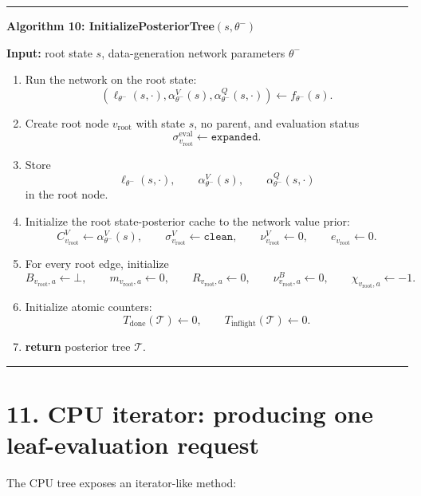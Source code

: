 \documentclass[11pt]{article}
\newcommand{\Tree}{\mathcal{T}}
\newenvironment{algorithmblock}[1]
{
  \par\medskip
  \noindent\hrule\par\smallskip
  \noindent\textbf{#1}
  \par\smallskip
}
{
  \par\smallskip\noindent\hrule\par\medskip
}
\newcommand{\Input}{\textbf{Input: }}
\newcommand{\Return}{\textbf{return }}
\begin{document}
\begin{algorithmblock}{Algorithm 10: InitializePosteriorTree\((s,\theta^-)\)}

\Input root state \(s\), data-generation network parameters \(\theta^-\)

\begin{enumerate}[leftmargin=2em]
  \item Run the network on the root state:
  \[
  \left(
  \ell_{\theta^-}(s,\cdot),
  \alpha_{\theta^-}^V(s),
  \alpha_{\theta^-}^Q(s,\cdot)
  \right)
  \gets
  f_{\theta^-}(s).
  \]

  \item Create root node \(v_{\mathrm{root}}\) with state \(s\), no parent, and
  evaluation status
  \[
  \sigma^{\mathrm{eval}}_{v_{\mathrm{root}}}\gets\texttt{expanded}.
  \]

  \item Store
  \[
  \ell_{\theta^-}(s,\cdot),
  \qquad
  \alpha_{\theta^-}^V(s),
  \qquad
  \alpha_{\theta^-}^Q(s,\cdot)
  \]
  in the root node.

  \item Initialize the root state-posterior cache to the network value prior:
  \[
  C^V_{v_{\mathrm{root}}}\gets \alpha_{\theta^-}^V(s),
  \qquad
  \sigma^V_{v_{\mathrm{root}}}\gets\texttt{clean},
  \qquad
  \nu^V_{v_{\mathrm{root}}}\gets 0,
  \qquad
  e_{v_{\mathrm{root}}}\gets 0.
  \]

  \item For every root edge, initialize
  \[
  B_{v_{\mathrm{root}},a}\gets \bot,
  \qquad
  m_{v_{\mathrm{root}},a}\gets 0,
  \qquad
  R_{v_{\mathrm{root}},a}\gets 0,
  \qquad
  \nu^B_{v_{\mathrm{root}},a}\gets 0,
  \qquad
  \chi_{v_{\mathrm{root}},a}\gets -1.
  \]

  \item Initialize atomic counters:
  \[
  T_{\mathrm{done}}(\Tree) \gets 0,
  \qquad
  T_{\mathrm{inflight}}(\Tree) \gets 0.
  \]

  \item \Return posterior tree \(\Tree\).
\end{enumerate}

\end{algorithmblock}

\section*{11. CPU iterator: producing one leaf-evaluation request}

The CPU tree exposes an iterator-like method:
\end{document}
